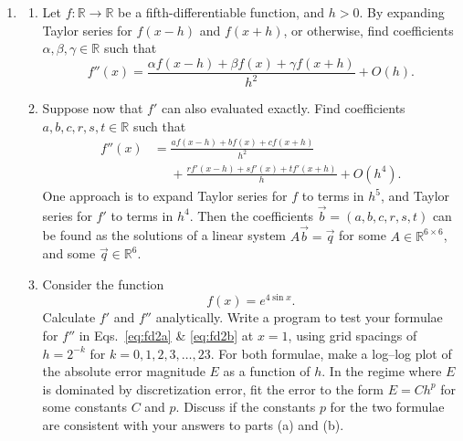 \documentclass[12pt]{article}
\newcommand{\R}{\mathbb{R}}
\begin{document}
\begin{enumerate}
\begin{enumerate}
        that match $\log(\Gamma(x))$ at the points $x=1,2,\ldots,k+1$.
        For each polynomial, evaluate the absolute error $|\exp(q_k(\tfrac32))
        - \Gamma(\tfrac32)|$. Which of the polynomials $q_k$ is most accurate?
      \item Examine the asymptotic behavior of $|p_k(\tfrac32) -
        \Gamma(\tfrac32)|$ and $|q_k(\tfrac32) -\Gamma(\tfrac32)|$ as $k \to
        \infty$.
    \end{enumerate}
  \item
    \begin{enumerate}
      \item Let $f: \R \to \R$ be a fifth-differentiable function, and $h>0$. By expanding Taylor series for $f(x-h)$ and $f(x+h)$, or otherwise,
        find coefficients $\alpha,\beta,\gamma \in \R$ such that
        \begin{equation}
          f''(x) = \frac{\alpha f(x-h) + \beta f(x) + \gamma f(x+h)}{h^2} + O(h).\label{eq:fd2a}
        \end{equation}
      \item Suppose now that $f'$ can also evaluated exactly. Find coefficients
        $a,b,c,r,s,t\in \R$ such that 
        \begin{align}
          f''(x) &= \frac{a f(x-h) + b f(x) + cf(x+h)}{h^2} \nonumber \\
                 &\phantom{=} + \frac{rf'(x-h) + s f'(x) + t f'(x+h)}{h} + O(h^4).\label{eq:fd2b}
        \end{align}
        One approach is to expand Taylor series for $f$ to terms in $h^5$, and
        Taylor series for $f'$ to terms in $h^4$. Then the coefficients
        $\vec{b}=(a,b,c,r,s,t)$ can be found as the solutions of a linear
        system $A \vec{b} = \vec{q}$ for some $A\in \R^{6\times 6}$, and some
        $\vec{q}\in \R^6$.
      \item Consider the function
        \begin{equation}
          f(x) = e^{4 \sin x}.
        \end{equation}
        Calculate $f'$ and $f''$ analytically. Write a program to test your
        formulae for $f''$ in Eqs.~\eqref{eq:fd2a} \& \eqref{eq:fd2b} at $x=1$,
        using grid spacings of $h=2^{-k}$ for $k=0,1,2,3,\ldots, 23$.
        For both formulae, make a log--log plot of the absolute error
        magnitude $E$ as a function of $h$. In the regime where $E$ is
        dominated by discretization error, fit the error to the form $E=C h^p$
        for some constants $C$ and $p$. Discuss if the constants
        $p$ for the two formulae are consistent with your answers to
        parts (a) and (b).
    \end{enumerate}    
\end{enumerate}
\end{document}
